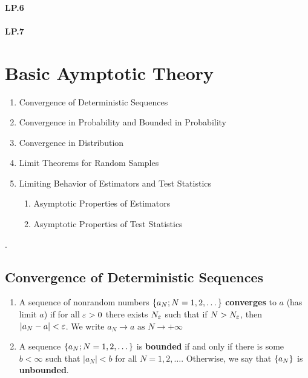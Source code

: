 \documentclass[11pt, oneside, a4paper, article]{article}
\numberwithin{equation}{section}
\begin{document}
\paragraph{LP.6}

\paragraph{LP.7}

\clearpage
\section{Basic Aymptotic Theory}

\noindent
\citet[C.3, p.35--45]{wool-2010}

\begin{enumerate}[noitemsep, label*=3.\arabic*.]
\item  Convergence of Deterministic Sequences
\item  Convergence in Probability and Bounded in Probability
\item  Convergence in Distribution
\item  Limit Theorems for Random Samples

\item  Limiting Behavior of Estimators and Test Statistics
\begin{enumerate}[noitemsep, leftmargin=1 em, label*=\arabic*.]
\item Asymptotic Properties of Estimators
\item Asymptotic Properties of Test Statistics
\end{enumerate}
\end{enumerate}

.

\subsection{Convergence of Deterministic Sequences}

\begin{defn}
\item
\begin{enumerate}
\item 
A sequence of nonrandom numbers 
$\{a_{N}; N = 1, 2, \dots\}$
\textbf{converges} to $a$ (has limit $a$) if for all $\varepsilon > 0$ there exists $N_{\varepsilon}$ such that if $N > N_{\varepsilon}$, then $|a_{N} - a| < \varepsilon$.
We write
$a_{N} \to a \text{ as } N \to +\infty$

\item
A  sequence 
$\{a_{N}; N = 1, 2, \dots\}$
is \textbf{bounded} if and only if there is some $b < \infty$ such that $|a_{N}| < b$ for all $N = 1, 2, \dots$.
Otherwise, we say that $\{a_{N}\}$ is \textbf{unbounded}.
\end{enumerate}
\end{defn}
\end{document}
